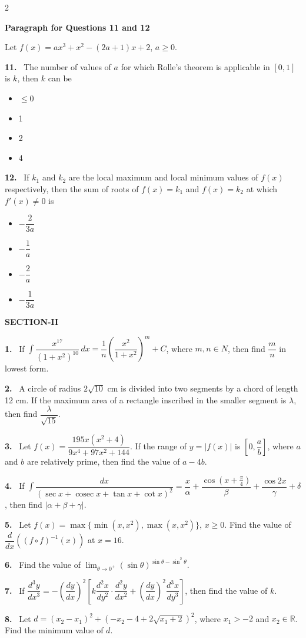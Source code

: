 \documentclass[10pt]{extarticle}
\newcommand{\sect}[1]{\par\smallskip\noindent\textbf{#1}\par}
\newcommand{\qn}[1]{\par\smallskip\noindent\textbf{#1.}~}
\newcommand{\paraq}[2]{\par\smallskip\noindent\textbf{Paragraph for Questions #1 and #2}\par}
\newenvironment{qoptions}{\begin{itemize}[leftmargin=1.8em,itemsep=1pt,topsep=2pt,label={}]}{\end{itemize}}
\newcommand{\opt}[2]{\item[(#1)] #2}
\begin{document}
\begin{multicols}{2}
\paraq{11}{12}
Let $f(x)=ax^3+x^2-(2a+1)x+2$, $a\ge0$.
\qn{11} The number of values of $a$ for which Rolle's theorem is applicable in $[0,1]$ is $k$, then $k$ can be
\begin{qoptions}
\opt{A}{$\le0$}
\opt{B}{1}
\opt{C}{2}
\opt{D}{4}
\end{qoptions}
\qn{12} If $k_1$ and $k_2$ are the local maximum and local minimum values of $f(x)$ respectively, then the sum of roots of $f(x)=k_1$ and $f(x)=k_2$ at which $f'(x)\ne0$ is
\begin{qoptions}
\opt{A}{$-\dfrac{2}{3a}$}
\opt{B}{$-\dfrac1a$}
\opt{C}{$-\dfrac2a$}
\opt{D}{$-\dfrac{1}{3a}$}
\end{qoptions}
\sect{SECTION-II}
\qn{1} If $\displaystyle\int\dfrac{x^{17}}{(1+x^2)^{10}}\,dx=\dfrac1n\left(\dfrac{x^2}{1+x^2}\right)^m+C$, where $m,n\in N$, then find $\dfrac mn$ in lowest form.
\qn{2} A circle of radius $2\sqrt{10}$ cm is divided into two segments by a chord of length 12 cm. If the maximum area of a rectangle inscribed in the smaller segment is $\lambda$, then find $\dfrac{\lambda}{\sqrt{15}}$.
\qn{3} Let $f(x)=\dfrac{195x(x^2+4)}{9x^4+97x^2+144}$. If the range of $y=|f(x)|$ is $\left[0,\dfrac ab\right]$, where $a$ and $b$ are relatively prime, then find the value of $a-4b$.
\qn{4} If $\displaystyle\int\dfrac{dx}{(\sec x+\operatorname{cosec}x+\tan x+\cot x)^2}=\dfrac x\alpha+\dfrac{\cos\left(x+\frac\pi4\right)}{\beta}+\dfrac{\cos2x}{\gamma}+\delta$, then find $|\alpha+\beta+\gamma|$.
\qn{5} Let $f(x)=\max\{\min(x,x^2),\max(x,x^2)\}$, $x\ge0$. Find the value of $\dfrac{d}{dx}\left((f\circ f)^{-1}(x)\right)$ at $x=16$.
\qn{6} Find the value of $\displaystyle\lim_{\theta\to0^+}(\sin\theta)^{\sin\theta-\sin^2\theta}$.
\qn{7} If $\dfrac{d^3y}{dx^3}=-\left(\dfrac{dy}{dx}\right)^2\left[k\dfrac{d^2x}{dy^2}\cdot\dfrac{d^2y}{dx^2}+\left(\dfrac{dy}{dx}\right)^2\dfrac{d^3x}{dy^3}\right]$, then find the value of $k$.
\qn{8} Let $d=(x_2-x_1)^2+\left(-x_2-4+2\sqrt{x_1+2}\right)^2$, where $x_1>-2$ and $x_2\in\mathbb{R}$. Find the minimum value of $d$.
\end{multicols}
\end{document}
